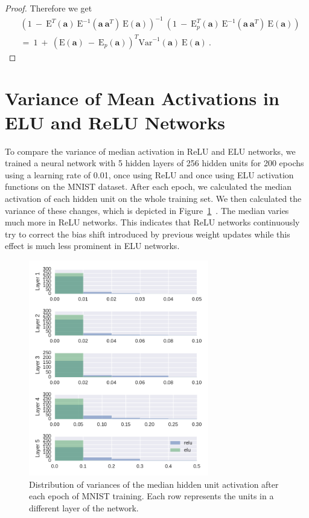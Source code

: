 \documentclass{article}
\newcommand\Ba{\bm{a}}
\newcommand\EXP{\mathbf{\mathrm{E}}}
\newcommand\VAR{\mathbf{\mathrm{Var}}}
\begin{document}
\begin{proof}
Therefore we get
\begin{align}
&\left( 1 \ - \ \EXP^T(\Ba) \ \EXP^{-1}(\Ba \ \Ba^T) \ \EXP(\Ba)
\right)^{-1} \ \left(1 \ - \ \EXP_p^T(\Ba) \ \EXP^{-1}(\Ba \ \Ba^T) \ \EXP(\Ba)\right)
\\ \nonumber
&= \ 1 \ + \  \left( \EXP(\Ba) \ - \ \EXP_p(\Ba) \right)^T
\VAR^{-1}(\Ba) \ \EXP(\Ba) \ .
\end{align}

\end{proof}

\section{Variance of Mean Activations in ELU and ReLU Networks}
\label{sec:varianceMean}
To compare the variance of median activation in ReLU and ELU networks,
we trained a neural network with 5 hidden layers of 256 hidden units for 200
epochs using a learning rate of 0.01, once using ReLU and once using ELU
activation functions on the MNIST dataset.
After each epoch, we calculated the median activation
of each hidden unit on the whole training set.
We then calculated the variance of these changes, which is depicted in
Figure~\ref{fig:varianceofchanges}\, . The median varies much more in ReLU networks.
This indicates that ReLU networks continuously try to correct
the bias shift introduced by previous weight updates
while this effect is much less prominent in ELU networks.
\begin{figure}[!ht]
\begin{center}
\includegraphics[width= 0.7\textwidth]{VariationOfChange}
\caption{Distribution of variances of the median hidden unit activation
after each epoch of MNIST training. Each row represents the units in
a different layer of the network.
\label{fig:varianceofchanges}}
\end{center}
\end{figure}
\end{document}
